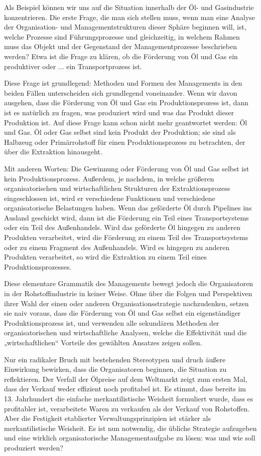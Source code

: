 \documentclass[11pt,a4paper]{article}
\begin{document}
Als Beispiel können wir uns auf die Situation innerhalb der Öl- und
Gasindustrie konzentrieren. Die erste Frage, die man sich stellen muss, wenn
man eine Analyse der Organisation- und Managementstrukturen dieser Sphäre
beginnen will, ist, welche Prozesse sind Führungspro\-zesse und gleichzeitig,
in welchem Rahmen muss das Objekt und der Gegenstand der Managementprozesse
beschrieben werden?  Etwa ist die Frage zu klären, ob die Förderung von Öl und
Gas ein produktiver oder ... ein Transportprozess ist.

Diese Frage ist grundlegend: Methoden und Formen des Managements in den beiden
Fällen unterscheiden sich grundlegend voneinander. Wenn wir davon ausgehen,
dass die Förderung von Öl und Gas ein Produktionsprozess ist, dann ist es
natürlich zu fragen, was produziert wird und was das Produkt dieser Produktion
ist. Auf diese Frage kann schon nicht mehr geantwortet werden: Öl und Gas. Öl
oder Gas selbst sind kein Produkt der Produktion; sie sind als Halbzeug oder
Primärrohstoff für einen Produktionsprozess zu betrachten, der über die
Extraktion hinausgeht.

Mit anderen Worten: Die Gewinnung oder Förderung von Öl und Gas selbst ist
kein Produk\-tions\-prozess. Außerdem, je nachdem, in welche größeren
organisatorischen und wirtschaftlichen Strukturen der Extraktionsprozess
eingeschlossen ist, wird er verschiedene Funktionen und verschiedene
organisatorische Belastungen haben. Wenn das geförderte Öl durch Pipelines ins
Ausland geschickt wird, dann ist die Förderung ein Teil eines Transportsystems
oder ein Teil des Außenhandels. Wird das geförderte Öl hingegen zu anderen
Produkten verarbeitet, wird die Förderung zu einem Teil des Transportsystems
oder zu einem Fragment des Außenhandels.  Wird es hingegen zu anderen
Produkten verarbeitet, so wird die Extraktion zu einem Teil eines
Produktionsprozesses.

Diese elementare Grammatik des Managements bewegt jedoch die Organisatoren in
der Roh\-stoff\-industrie in keiner Weise. Ohne über die Folgen und
Perspektiven ihrer Wahl der einen oder anderen Organisationsstrategie
nachzudenken, setzen sie naiv voraus, dass die Förderung von Öl und Gas selbst
ein eigenständiger Produktionsprozess ist, und verwenden alle sekundären
Methoden der organisatorischen und wirtschaftliche Analysen, welche die
Effektivität und die „wirtschaftlichen“ Vorteile des gewählten Ansatzes zeigen
sollen.

Nur ein radikaler Bruch mit bestehenden Stereotypen und druch äußere
Einwirkung bewirken, dass die Organisatoren beginnen, die Situation zu
reflektieren. Der Verfall der Ölpreise auf dem Weltmarkt zeigt zum ersten Mal,
dass der Verkauf weder effizient noch profitabel ist. Es stimmt, dass bereits
im 13. Jahrhundert die einfache merkantilistische Weisheit formuliert wurde,
dass es profitabler ist, verarbeitete Waren zu verkaufen als der Verkauf von
Rohstoffen. Aber die Festigkeit etablierter Verwaltungsprinzipien ist stärker
als merkantilistische Weisheit. Es ist nun notwendig, die übliche Strategie
aufzugeben und eine wirklich organisatorische Managementaufgabe zu lösen: was
und wie soll produziert werden?
\end{document}
